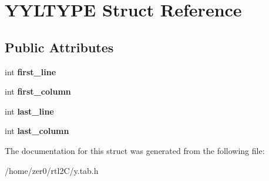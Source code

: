 \hypertarget{struct_y_y_l_t_y_p_e}{}\section{Y\+Y\+L\+T\+Y\+PE Struct Reference}
\label{struct_y_y_l_t_y_p_e}
\subsection*{Public Attributes}
\begin{DoxyCompactItemize}
\item 
\mbox{\label{struct_y_y_l_t_y_p_e_a50ad3435eaea74bcab6f1ae5fbaefd89}} 
int {\bfseries first\+\_\+line}
\item 
\mbox{\label{struct_y_y_l_t_y_p_e_a3a556533babab1b9066fa9bdbb809210}} 
int {\bfseries first\+\_\+column}
\item 
\mbox{\label{struct_y_y_l_t_y_p_e_a3075f2bc3448df5d2a9f16d22bff2cc1}} 
int {\bfseries last\+\_\+line}
\item 
\mbox{\label{struct_y_y_l_t_y_p_e_acf87f8c98686f286eaf700c4b62157b2}} 
int {\bfseries last\+\_\+column}
\end{DoxyCompactItemize}


The documentation for this struct was generated from the following file\+:\begin{DoxyCompactItemize}
\item 
/home/zer0/rtl2\+C/y.\+tab.\+h\end{DoxyCompactItemize}
